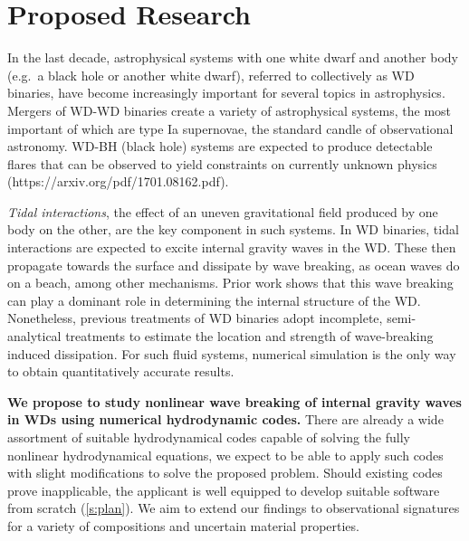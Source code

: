 \documentclass[12pt,
        usenames, %
        dvipsnames %
    ]{article}
\begin{document}
\def\Snospace~{\S{}} %
\renewcommand*{\sectionautorefname}{\Snospace}
\renewcommand*{\appendixautorefname}{\Snospace}
\renewcommand*{\figureautorefname}{Fig.}
\renewcommand*{\equationautorefname}{Eq.}
\renewcommand*{\tableautorefname}{Tab.}

\onehalfspacing


\section{Proposed Research}

In the last decade, astrophysical systems with one white dwarf and another
body (e.g.\ a black hole or another white dwarf), referred to collectively as WD
binaries, have become increasingly important for several topics in astrophysics.
Mergers of WD-WD binaries create a variety of astrophysical systems, the most
important of which are type Ia supernovae, the standard candle of observational
astronomy. WD-BH (black hole) systems are expected to produce detectable flares
that can be observed to yield constraints on currently unknown physics
(https://arxiv.org/pdf/1701.08162.pdf).

\emph{Tidal interactions}, the effect of an uneven gravitational field produced
by one body on the other, are the key component in such systems. In WD binaries,
tidal interactions are expected to excite internal gravity waves in the WD\@.
These then propagate towards the surface and dissipate by wave breaking, as ocean
waves do on a beach, among other mechanisms.
Prior work shows that this wave breaking can play a dominant role in determining
the internal structure of the WD\@. Nonetheless, previous treatments of WD
binaries adopt incomplete, semi-analytical treatments to estimate the location
and strength of wave-breaking induced dissipation. For such fluid systems,
numerical simulation is the only way to obtain quantitatively accurate results.

\textbf{We propose to study nonlinear wave breaking of internal gravity waves in
WDs using numerical hydrodynamic codes.} There are already a wide assortment of
suitable hydrodynamical codes
capable of solving the fully nonlinear hydrodynamical equations, we expect to be
able to apply such codes with slight modifications to solve the proposed
problem. Should existing codes prove inapplicable, the applicant is well
equipped to develop suitable software from scratch (\autoref{s:plan}). We aim
to extend our findings to observational signatures for a variety of compositions
and uncertain material properties.
\end{document}
